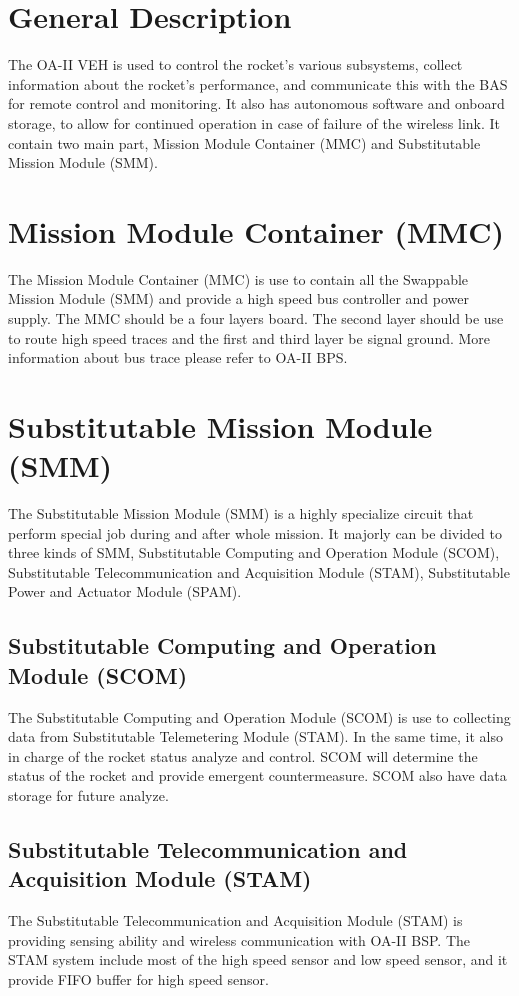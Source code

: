 \documentclass[12pt,article]{memoir}
\begin{document}
\section{General Description}
The OA-II VEH is used to control the rocket's various subsystems, collect information about the rocket's performance, and communicate this with the BAS for remote control and monitoring. It also has autonomous software and onboard storage, to allow for continued operation in case of failure of the wireless link. It contain two main part, Mission Module Container (MMC) and Substitutable Mission Module (SMM).
\section{Mission Module Container (MMC)}
The Mission Module Container (MMC) is use to contain all the Swappable Mission Module (SMM) and provide a high speed bus controller and power supply. The MMC should be a four layers board. The second layer should be use to route high speed traces and the first and third layer be signal ground. More information about bus trace please refer to OA-II BPS.
\section{Substitutable Mission Module (SMM)}
The Substitutable Mission Module (SMM) is a highly specialize circuit that perform special job during and after whole mission. It majorly can be divided to three kinds of SMM, Substitutable Computing and Operation Module (SCOM), Substitutable Telecommunication and Acquisition Module (STAM), Substitutable Power and Actuator Module (SPAM).
\subsection{Substitutable Computing and Operation Module (SCOM)}
The Substitutable Computing and Operation Module (SCOM) is use to collecting data from Substitutable Telemetering Module (STAM). In the same time, it also in charge of the rocket status analyze and control. SCOM will determine the status of the rocket and provide emergent countermeasure. SCOM also have data storage for future analyze.
\subsection{Substitutable Telecommunication and Acquisition Module (STAM)}
The Substitutable Telecommunication and Acquisition Module (STAM) is providing sensing ability and wireless communication with OA-II BSP. The STAM system include most of the high speed sensor and low speed sensor, and it provide FIFO buffer for high speed sensor.
\end{document}
